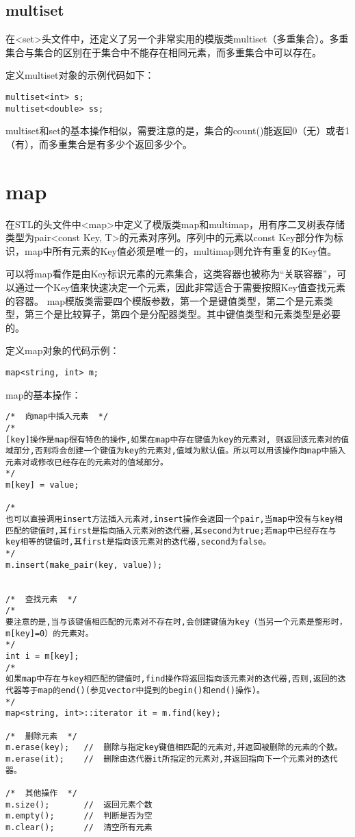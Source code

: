 \subsection{multiset}
在<set>头文件中，还定义了另一个非常实用的模版类multiset（多重集合）。多重集合与集合的区别在于集合中不能存在相同元素，而多重集合中可以存在。

定义multiset对象的示例代码如下：
\begin{lstlisting}
multiset<int> s;
multiset<double> ss;
\end{lstlisting}

multiset和set的基本操作相似，需要注意的是，集合的count()能返回0（无）或者1（有），而多重集合是有多少个返回多少个。


\section{map}
在STL的头文件中<map>中定义了模版类map和multimap，用有序二叉树表存储类型为pair<const Key, T>的元素对序列。序列中的元素以const Key部分作为标识，map中所有元素的Key值必须是唯一的，multimap则允许有重复的Key值。

可以将map看作是由Key标识元素的元素集合，这类容器也被称为“关联容器”，可以通过一个Key值来快速决定一个元素，因此非常适合于需要按照Key值查找元素的容器。 
map模版类需要四个模版参数，第一个是键值类型，第二个是元素类型，第三个是比较算子，第四个是分配器类型。其中键值类型和元素类型是必要的。

定义map对象的代码示例：

\begin{lstlisting}
map<string, int> m;
\end{lstlisting}

map的基本操作：

\begin{lstlisting}
/*  向map中插入元素  */
/*
[key]操作是map很有特色的操作,如果在map中存在键值为key的元素对, 则返回该元素对的值域部分,否则将会创建一个键值为key的元素对,值域为默认值。所以可以用该操作向map中插入元素对或修改已经存在的元素对的值域部分。
*/
m[key] = value;

/*
也可以直接调用insert方法插入元素对,insert操作会返回一个pair,当map中没有与key相匹配的键值时,其first是指向插入元素对的迭代器,其second为true;若map中已经存在与key相等的键值时,其first是指向该元素对的迭代器,second为false。
*/
m.insert(make_pair(key, value));


/*  查找元素  */
/*
要注意的是,当与该键值相匹配的元素对不存在时,会创建键值为key（当另一个元素是整形时，m[key]=0）的元素对。
*/
int i = m[key];
/*
如果map中存在与key相匹配的键值时,find操作将返回指向该元素对的迭代器,否则,返回的迭代器等于map的end()(参见vector中提到的begin()和end()操作)。
*/
map<string, int>::iterator it = m.find(key);

/*  删除元素  */
m.erase(key);   //  删除与指定key键值相匹配的元素对,并返回被删除的元素的个数。
m.erase(it);    //  删除由迭代器it所指定的元素对,并返回指向下一个元素对的迭代器。

/*  其他操作  */
m.size();       //  返回元素个数
m.empty();      //  判断是否为空
m.clear();      //  清空所有元素
\end{lstlisting}

